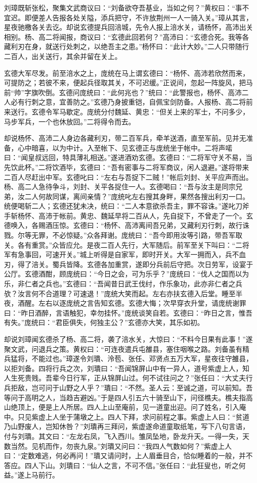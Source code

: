刘璋既斩张松，聚集文武商议曰：“刘备欲夺吾基业，当如之何？”黄权曰：“事不宜迟。即便差人告报各处关隘，添兵把守，不许放荆州一人一骑入关。”璋从其言，星夜驰檄各关去讫。却说玄德提兵回涪城，先令人报上涪水关，请杨怀，高沛出关相别。杨、高二将闻报，商议曰：“玄德此回若何？”高沛曰：“玄德合死。我等各藏利刃在身，就送行处刺之，以绝吾主之患。”杨怀曰：“此计大妙。”二人只带随行二百人，出关送行，其余并留在关上。

玄德大军尽发。前至涪水之上，庞统在马上谓玄德曰：“杨怀、高沛若欣然而来，可提防之；若彼不来，便起兵径取其关，不可迟缓。”正说间，忽起一阵旋风，把马前“帅”字旗吹倒。玄德问庞统曰：“此何兆也？”统曰：“此警报也，杨怀、高沛二人必有行刺之意，宜善防之。”玄德乃身披重铠，自佩宝剑防备。人报杨、高二将前来送行。玄德令军马歇定。庞统分付魏延、黄忠：“但关上来的军士，不问多少，马步军兵，一个也休放回。”二将得令而去。

却说杨怀、高沛二人身边各藏利刃，带二百军兵，牵羊送酒，直至军前。见并无准备，心中暗喜，以为中计。入至帐下、见玄德正与庞统坐于帐中。二将声喏曰：“闻皇叔远回，特具薄礼相送。”遂进酒劝玄德。玄德曰：“二将军守关不易，当先饮此杯。”二将饮酒毕，玄德曰：“吾有密事与二将军商议，闲人退避。”遂将带来二百人尽赶出中军。玄德叱曰：“左右与吾捉下二贼！”帐后刘封、关平应声而出。杨、高二人急待争斗，刘封、关平各捉住一人。玄德喝曰：“吾与汝主是同宗兄弟，汝二人何故同谋，离间亲情？”庞统叱左右搜其身畔，果然各搜出利刃一口。统便喝斩二人；玄德还犹未决，统曰：“二人本意欲杀吾主，罪不容诛。”遂叱刀斧手斩杨怀、高沛于帐前。黄忠、魏延早将二百从人，先自捉下，不曾走了一个。玄德唤入，各赐酒压惊。玄德曰：“杨怀、高沛离间吾兄弟，又藏利刃行刺，故行诛戮。尔等无罪，不必惊疑。”众各拜谢。庞统曰：“吾今即用汝等引路，带吾军取关。各有重赏。”众皆应允。是夜二百人先行，大军随后。前军至关下叫曰：“二将军有急事回，可速开关。”城上听得是自家军，即时开关。大军一拥而入，兵不血刃，得了涪关。蜀兵皆降。玄德各加重赏，遂即分兵前后守把。次日劳军，设宴于公厅。玄德酒酣，顾庞统曰：“今日之会，可为乐乎？”庞统曰：“伐人之国而以为乐，非仁者之兵也。”玄德曰：“吾闻昔日武王伐纣，作乐象功，此亦非仁者之兵欤？汝言何不合道理？可速退！”庞统大笑而起。左右亦扶玄德入后堂。睡至半夜，酒醒。左右以逐庞统之言告知玄德。玄德大悔；次早穿衣升堂，请庞统谢罪曰：“昨日酒醉，言语触犯，幸勿挂怀。”庞统谈笑自若。玄德曰：“昨日之言，惟吾有失。”庞统曰：“君臣俱失，何独主公？”玄德亦大笑，其乐如初。

却说刘璋闻玄德杀了杨、高二将，袭了涪水关，大惊曰：“不料今日果有此事！”遂聚文武，问退兵之策。黄权曰：“可连夜遣兵屯雒县，塞住咽喉之路。刘备虽有精兵猛将，不能过也。”璋遂令刘璝、泠苞、张任、邓贤点五万大军，星夜往守雒县，以拒刘备。四将行兵之次，刘璝曰：“吾闻锦屏山中有一异人，道号紫虚上人，知人生死贵贱。吾辈今日行军，正从锦屏山过。何不试往问之？”张任曰：“大丈夫行兵拒敌，岂可问于山野之人乎？”璝曰：“不然。圣人云：至诚之道，可以前知。吾等问于高明之人，当趋吉避凶。”于是四人引五六十骑至山下，问径樵夫。樵夫指高山绝顶上，便是上人所居。四人上山至庵前，见一道童出迎。问了姓名，引入庵中。只见紫虚上人坐于蒲墩之上。四人下拜，求问前程之事。紫虚上人曰：“贫道乃山野废人，岂知休咎？”刘璝再三拜问，紫虚遂命道童取纸笔，写下八句言语，付与刘璝。其文曰：“左龙右凤，飞入西川。雏凤坠地，卧龙升天。一得一失，天数当然。见机而作，勿丧九泉。”刘璝又问曰：“我四人气数如何？”紫虚上人曰：“定数难逃，何必再问！”璝又请问时，上人眉垂目合，恰似睡着的一般，并不答应。四人下山。刘璝曰：“仙人之言，不可不信。”张任曰：“此狂叟也，听之何益。”遂上马前行。

